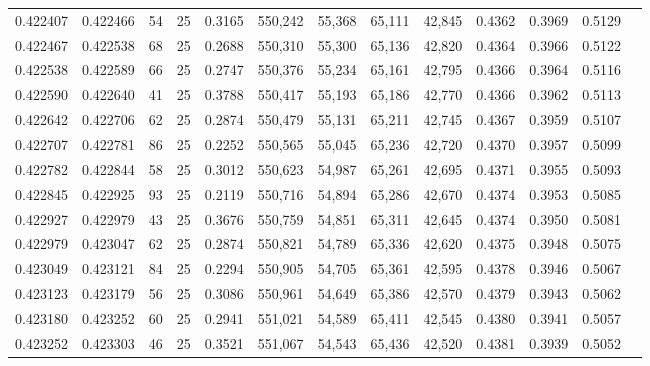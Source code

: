 \begin{tabular}{rrrrrrrrrrrrr}
0.422407 & 0.422466 &    54 &  25 &                                     0.3165 & 550,242 &  55,368 &  65,111 &  42,845 & 0.4362 & 0.3969 & 0.5129 \\
0.422467 & 0.422538 &    68 &  25 &                                     0.2688 & 550,310 &  55,300 &  65,136 &  42,820 & 0.4364 & 0.3966 & 0.5122 \\
0.422538 & 0.422589 &    66 &  25 &                                     0.2747 & 550,376 &  55,234 &  65,161 &  42,795 & 0.4366 & 0.3964 & 0.5116 \\
0.422590 & 0.422640 &    41 &  25 &                                     0.3788 & 550,417 &  55,193 &  65,186 &  42,770 & 0.4366 & 0.3962 & 0.5113 \\
0.422642 & 0.422706 &    62 &  25 &                                     0.2874 & 550,479 &  55,131 &  65,211 &  42,745 & 0.4367 & 0.3959 & 0.5107 \\
0.422707 & 0.422781 &    86 &  25 &                                     0.2252 & 550,565 &  55,045 &  65,236 &  42,720 & 0.4370 & 0.3957 & 0.5099 \\
0.422782 & 0.422844 &    58 &  25 &                                     0.3012 & 550,623 &  54,987 &  65,261 &  42,695 & 0.4371 & 0.3955 & 0.5093 \\
0.422845 & 0.422925 &    93 &  25 &                                     0.2119 & 550,716 &  54,894 &  65,286 &  42,670 & 0.4374 & 0.3953 & 0.5085 \\
0.422927 & 0.422979 &    43 &  25 &                                     0.3676 & 550,759 &  54,851 &  65,311 &  42,645 & 0.4374 & 0.3950 & 0.5081 \\
0.422979 & 0.423047 &    62 &  25 &                                     0.2874 & 550,821 &  54,789 &  65,336 &  42,620 & 0.4375 & 0.3948 & 0.5075 \\
0.423049 & 0.423121 &    84 &  25 &                                     0.2294 & 550,905 &  54,705 &  65,361 &  42,595 & 0.4378 & 0.3946 & 0.5067 \\
0.423123 & 0.423179 &    56 &  25 &                                     0.3086 & 550,961 &  54,649 &  65,386 &  42,570 & 0.4379 & 0.3943 & 0.5062 \\
0.423180 & 0.423252 &    60 &  25 &                                     0.2941 & 551,021 &  54,589 &  65,411 &  42,545 & 0.4380 & 0.3941 & 0.5057 \\
0.423252 & 0.423303 &    46 &  25 &                                     0.3521 & 551,067 &  54,543 &  65,436 &  42,520 & 0.4381 & 0.3939 & 0.5052 \\

\end{tabular}
